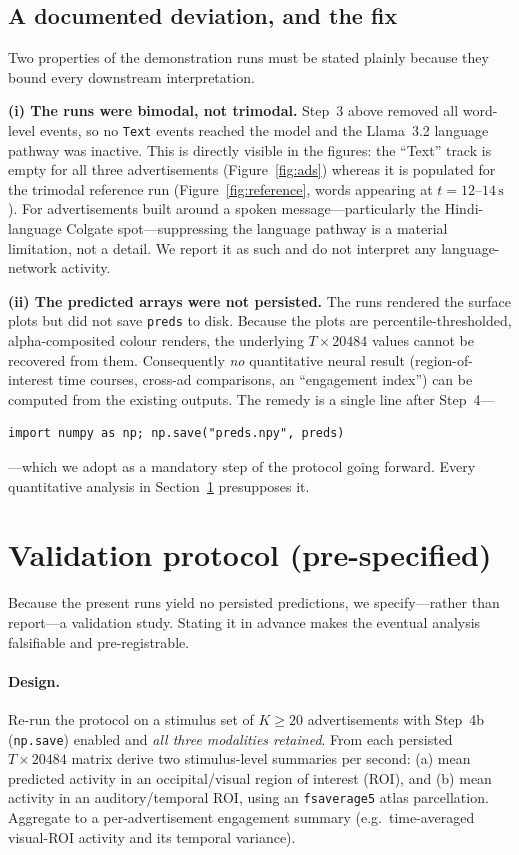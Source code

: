 \documentclass[11pt]{article}
\begin{document}
\subsection{A documented deviation, and the fix}
\label{sec:deviation}
Two properties of the demonstration runs must be stated plainly because they
bound every downstream interpretation.

\textbf{(i) The runs were bimodal, not trimodal.} Step~3 above removed all
word-level events, so no \texttt{Text} events reached the model and the
Llama~3.2 language pathway was inactive. This is directly visible in the
figures: the ``Text'' track is empty for all three advertisements
(Figure~\ref{fig:ads}) whereas it is populated for the trimodal reference run
(Figure~\ref{fig:reference}, words appearing at $t=12$--$14\,\mathrm{s}$). For
advertisements built around a spoken message---particularly the Hindi-language
Colgate spot---suppressing the language pathway is a material limitation, not a
detail. We report it as such and do not interpret any language-network
activity.

\textbf{(ii) The predicted arrays were not persisted.} The runs rendered the
surface plots but did not save \texttt{preds} to disk. Because the plots are
percentile-thresholded, alpha-composited colour renders, the underlying
$T\times20484$ values cannot be recovered from them. Consequently \emph{no}
quantitative neural result (region-of-interest time courses, cross-ad
comparisons, an ``engagement index'') can be computed from the existing
outputs. The remedy is a single line after Step~4---
{\footnotesize
\begin{verbatim}
import numpy as np; np.save("preds.npy", preds)
\end{verbatim}
}
---which we adopt as a mandatory step of the protocol going forward. Every
quantitative analysis in Section~\ref{sec:validation} presupposes it.

\section{Validation protocol (pre-specified)}
\label{sec:validation}

Because the present runs yield no persisted predictions, we specify---rather
than report---a validation study. Stating it in advance makes the eventual
analysis falsifiable and pre-registrable.

\paragraph{Design.} Re-run the protocol on a stimulus set of $K \geq 20$
advertisements with Step~4b (\texttt{np.save}) enabled and \emph{all three
modalities retained}. From each persisted $T\times20484$ matrix derive two
stimulus-level summaries per second: (a) mean predicted activity in an
occipital/visual region of interest (ROI), and (b) mean activity in an
auditory/temporal ROI, using an \texttt{fsaverage5} atlas parcellation.
Aggregate to a per-advertisement engagement summary (e.g.\ time-averaged
visual-ROI activity and its temporal variance).
\end{document}
